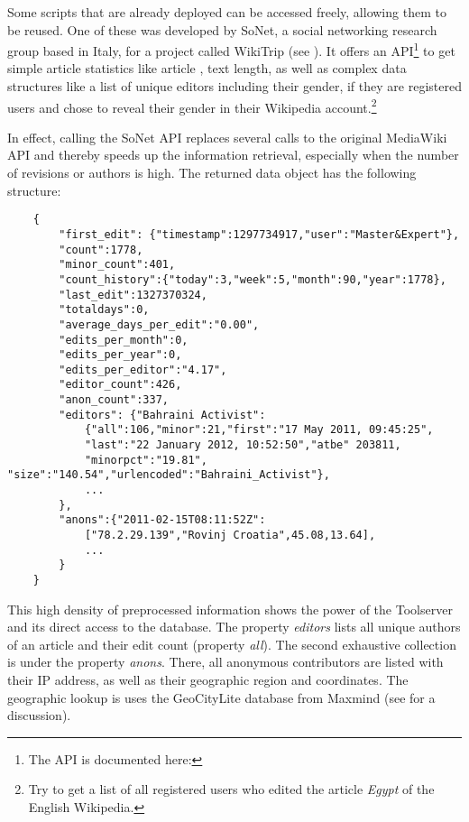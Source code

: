 Some scripts that are already deployed can be accessed freely, allowing them to be reused.
One of these was developed by SoNet, a social networking research group based in Italy, for a project called WikiTrip (see ).
It offers an \ac{API}\footnote{The \ac{API} is documented here: } to get simple article statistics like article , text length, as well as complex data structures like a list of unique editors including their gender, if they are registered users and chose to reveal their gender in their Wikipedia account.\footnote{Try  to get a list of all registered users who edited the article \emph{Egypt} of the English Wikipedia.}

In effect, calling the SoNet \ac{API} replaces several calls to the original MediaWiki \ac{API} and thereby speeds up the information retrieval, especially when the number of revisions or authors is high.
The returned data object has the following structure:

\begin{lstlisting}
	{
		"first_edit": {"timestamp":1297734917,"user":"Master&Expert"},
		"count":1778,
		"minor_count":401,
		"count_history":{"today":3,"week":5,"month":90,"year":1778},
		"last_edit":1327370324,
		"totaldays":0,
		"average_days_per_edit":"0.00",
		"edits_per_month":0,
		"edits_per_year":0,
		"edits_per_editor":"4.17",
		"editor_count":426,
		"anon_count":337,
		"editors": {"Bahraini Activist":
			{"all":106,"minor":21,"first":"17 May 2011, 09:45:25",
			"last":"22 January 2012, 10:52:50","atbe" 203811,
			"minorpct":"19.81", "size":"140.54","urlencoded":"Bahraini_Activist"},
			...
		},
		"anons":{"2011-02-15T08:11:52Z":
			["78.2.29.139","Rovinj Croatia",45.08,13.64],
			...
		}
	}
\end{lstlisting}

This high density of preprocessed information shows the power of the Toolserver and its direct access to the database.
The property \emph{editors} lists all unique authors of an article and their edit count (property \emph{all}).
The second exhaustive collection is under the property \emph{anons}. 
There, all anonymous contributors are listed with their \ac{IP} address, as well as their geographic region and coordinates.
The geographic lookup is uses the GeoCityLite database from Maxmind (see  for a discussion).

